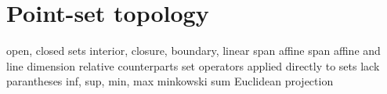 \chapter{Point-set topology}
\label{chap:point_set_topology}

open, closed sets
interior, closure, boundary,
linear span 
affine span
affine and line dimension 
relative counterparts
set operators applied directly to sets lack parantheses 
inf, sup, min, max
minkowski sum
Euclidean projection
